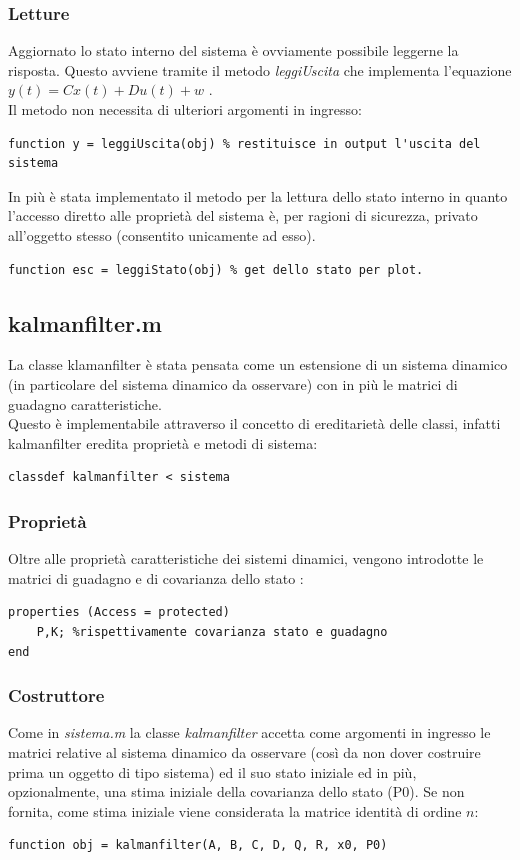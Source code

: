 \subsubsection{Letture}
Aggiornato lo stato interno del sistema è ovviamente possibile leggerne la risposta. Questo avviene tramite il metodo \textit{leggiUscita} che implementa l'equazione $y(t) = Cx(t)+Du(t)+w$ .\\
Il metodo non necessita di ulteriori argomenti in ingresso:

\begin{lstlisting}[frame=single]
function y = leggiUscita(obj) % restituisce in output l'uscita del sistema 
\end{lstlisting}

In più è stata implementato il metodo per la lettura dello stato interno in quanto l'accesso diretto alle proprietà del sistema è, per ragioni di sicurezza, privato all'oggetto stesso (consentito unicamente ad esso).
\begin{lstlisting}[frame=single]
function esc = leggiStato(obj) % get dello stato per plot.
\end{lstlisting}

\newpage

\subsection{kalmanfilter.m}
La classe klamanfilter è stata pensata come un estensione di un sistema dinamico (in particolare del sistema dinamico da osservare) con in più le matrici di guadagno caratteristiche.\\
Questo è implementabile attraverso il concetto di ereditarietà delle classi, infatti kalmanfilter eredita proprietà e metodi di sistema:
\begin{lstlisting}[frame=single]
classdef kalmanfilter < sistema 
\end{lstlisting}
\subsubsection{Proprietà}
Oltre alle proprietà caratteristiche dei sistemi dinamici, vengono introdotte le matrici di guadagno e di covarianza dello stato :
\begin{lstlisting}[frame=single]
properties (Access = protected)
	P,K; %rispettivamente covarianza stato e guadagno
end
\end{lstlisting}
\subsubsection{Costruttore}
Come in \textit{sistema.m} la classe \textit{kalmanfilter} accetta come argomenti in ingresso le matrici relative al sistema dinamico da osservare (così da non dover costruire prima un oggetto di tipo sistema) ed il suo stato iniziale ed in più, opzionalmente, una stima  iniziale della covarianza dello stato (P0). Se non fornita, come stima iniziale viene considerata la matrice identità di ordine $n$:
\begin{lstlisting}[frame=single]
function obj = kalmanfilter(A, B, C, D, Q, R, x0, P0)
\end{lstlisting}

